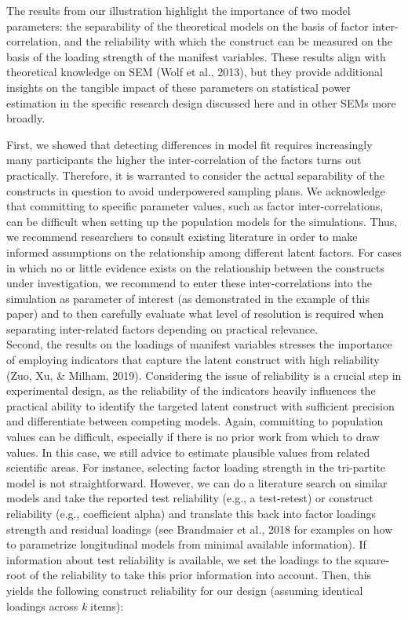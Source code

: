 \documentclass[
  man,floatsintext]{apa6}
\begin{document}
The results from our illustration highlight the importance of two model parameters: the separability of the theoretical models on the basis of factor inter-correlation, and the reliability with which the construct can be measured on the basis of the loading strength of the manifest variables. These results align with theoretical knowledge on SEM (Wolf et al., 2013), but they provide additional insights on the tangible impact of these parameters on statistical power estimation in the specific research design discussed here and in other SEMs more broadly.

First, we showed that detecting differences in model fit requires increasingly many participants the higher the inter-correlation of the factors turns out practically. Therefore, it is warranted to consider the actual separability of the constructs in question to avoid underpowered sampling plans. We acknowledge that committing to specific parameter values, such as factor inter-correlations, can be difficult when setting up the population models for the simulations. Thus, we recommend researchers to consult existing literature in order to make informed assumptions on the relationship among different latent factors. For cases in which no or little evidence exists on the relationship between the constructs under investigation, we recommend to enter these inter-correlations into the simulation as parameter of interest (as demonstrated in the example of this paper) and to then carefully evaluate what level of resolution is required when separating inter-related factors depending on practical relevance.\\
Second, the results on the loadings of manifest variables stresses the importance of employing indicators that capture the latent construct with high reliability (Zuo, Xu, \& Milham, 2019). Considering the issue of reliability is a crucial step in experimental design, as the reliability of the indicators heavily influences the practical ability to identify the targeted latent construct with sufficient precision and differentiate between competing models. Again, committing to population values can be difficult, especially if there is no prior work from which to draw values. In this case, we still advice to estimate plausible values from related scientific areas. For instance, selecting factor loading strength in the tri-partite model is not straightforward. However, we can do a literature search on similar models and take the reported test reliability (e.g., a test-retest) or construct reliability (e.g., coefficient alpha) and translate this back into factor loadings strength and residual loadings (see Brandmaier et al., 2018 for examples on how to parametrize longitudinal models from minimal available information). If information about test reliability is available, we set the loadings to the square-root of the reliability to take this prior information into account. Then, this yields the following construct reliability for our design (assuming identical loadings across \emph{k} items):
\end{document}
